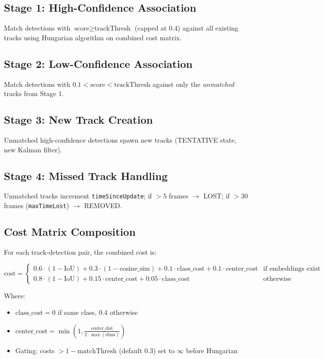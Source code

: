 \subsection{Stage 1: High-Confidence Association}
Match detections with $\text{score} \ge \text{trackThresh}$ (capped at 0.4) against all existing tracks using Hungarian algorithm on combined cost matrix.

\subsection{Stage 2: Low-Confidence Association}
Match detections with $0.1 < \text{score} < \text{trackThresh}$ against only the \textit{unmatched} tracks from Stage 1.

\subsection{Stage 3: New Track Creation}
Unmatched high-confidence detections spawn new tracks (TENTATIVE state, new Kalman filter).

\subsection{Stage 4: Missed Track Handling}
Unmatched tracks increment \texttt{timeSinceUpdate}; if $> 5$ frames $\to$ LOST; if $> 30$ frames (\texttt{maxTimeLost}) $\to$ REMOVED.

\subsection{Cost Matrix Composition}
\label{sec:cost-matrix}
For each track-detection pair, the combined cost is:

\[
\text{cost} = 
\begin{cases}
0.6 \cdot (1 - \text{IoU}) + 0.3 \cdot (1 - \text{cosine\_sim}) + 0.1 \cdot \text{class\_cost} + 0.1 \cdot \text{center\_cost} & \text{if embeddings exist} \\
0.8 \cdot (1 - \text{IoU}) + 0.15 \cdot \text{center\_cost} + 0.05 \cdot \text{class\_cost} & \text{otherwise}
\end{cases}
\]

Where:
\begin{itemize}
    \item $\text{class\_cost} = 0$ if same class, $0.4$ otherwise
    \item $\text{center\_cost} = \min(1, \frac{\text{center\_dist}}{2 \cdot \max(\text{dims})})$
    \item Gating: costs $> 1 - \text{matchThresh}$ (default 0.3) set to $\infty$ before Hungarian
\end{itemize}

